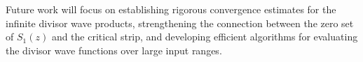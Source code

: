 \documentclass{article}
\begin{document}
Future work will focus on establishing rigorous convergence estimates for the infinite divisor wave products, strengthening the connection between the zero set of $S_1(z)$ and the critical strip, and developing efficient algorithms for evaluating the divisor wave functions over large input ranges.

\nocite{*}
\printbibliography
\end{document}
